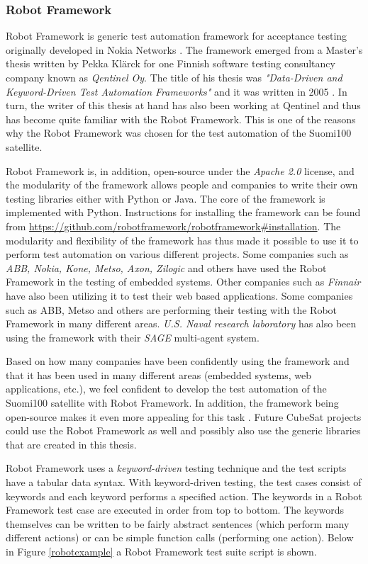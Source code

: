 \documentclass[english,12pt,a4paper,pdftex,elec,utf8]{aaltothesis}
\begin{document}
\subsubsection{Robot Framework}
Robot Framework is generic test automation framework for acceptance testing originally developed in Nokia Networks \cite{robotmain}. The framework emerged from a Master's thesis written by Pekka Klärck for one Finnish software testing consultancy company known as \textit{Qentinel Oy}. The title of his thesis was \textit{"Data-Driven and Keyword-Driven Test Automation Frameworks"} and it was written in 2005 \cite{robotmain, klerkdippa}. In turn, the writer of this thesis at hand has also been working at Qentinel and thus has become quite familiar with the Robot Framework. This is one of the reasons why the Robot Framework was chosen for the test automation of the Suomi100 satellite. \par 
Robot Framework is, in addition, open-source under the \textit{Apache 2.0} license, and the modularity of the framework allows people and companies to write their own testing libraries either with Python or Java. The core of the framework is implemented with Python. Instructions for installing the framework can be found from \url{https://github.com/robotframework/robotframework#installation}.
The modularity and flexibility of the framework has thus made it possible to use it to perform test automation on various different projects. Some companies such as \textit{ABB, Nokia, Kone, Metso, Axon, Zilogic} and others have used the Robot Framework in the testing of embedded systems. Other companies such as \textit{Finnair} have also been utilizing it to test their web based applications. Some companies such as ABB, Metso and others are performing their testing with the Robot Framework in many different areas. \textit{U.S. Naval research laboratory} has also been using the framework with their \textit{SAGE} multi-agent system. \cite{robotmain}\par 
Based on how many companies have been confidently using the framework \cite{robotmain} and that it has been used in many different areas (embedded systems, web applications, etc.), we feel confident to develop the test automation of the Suomi100 satellite with Robot Framework. In addition, the framework being open-source makes it even more appealing for this task \cite{robotmain}. Future CubeSat projects could use the Robot Framework as well and possibly also use the generic libraries that are created in this thesis.\par
Robot Framework uses a \textit{keyword-driven} testing technique and the test scripts have a tabular data syntax. With keyword-driven testing, the test cases consist of keywords and each keyword performs a specified action. The keywords in a Robot Framework test case are executed in order from top to bottom. The keywords themselves can be written to be fairly abstract sentences (which perform many different actions) or can be simple function calls (performing one action). Below in Figure \ref{robotexample} a Robot Framework test suite script is shown. \cite{robotuserguide}\par 
\end{document}
